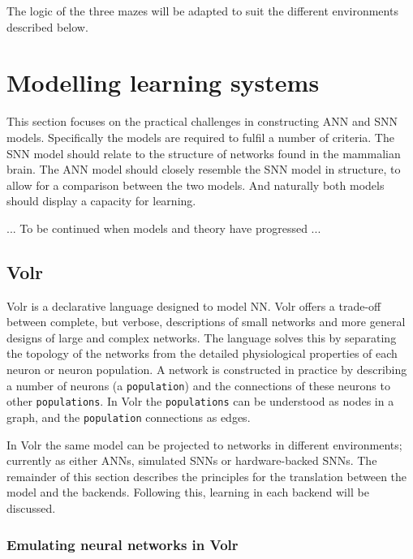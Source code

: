 \documentclass[report.tex]{subfiles}
\begin{document}
The logic of the three mazes will be adapted to suit the different environments described below.

\section{Modelling learning systems} \label{sec:learning}
This section focuses on the practical challenges in constructing ANN and SNN models.
Specifically the models are required to fulfil a number of criteria.
The SNN model should relate to the structure of networks found in the mammalian brain.
The ANN model should closely resemble the SNN model in structure, to allow for a comparison between the two models.
And naturally both models should display a capacity for learning.

... To be continued when models and theory have progressed ...

\subsection{Volr}
Volr is a declarative language designed to model \gls{NN}.
Volr offers a trade-off between complete, but verbose, descriptions of small networks and more general designs of large and complex networks.
The language solves this by separating the topology of the networks from the detailed physiological properties of each neuron or neuron population.
A network is constructed in practice by describing a number of neurons (a \texttt{population}) and the connections of these neurons to other \texttt{populations}.
In Volr the \texttt{populations} can be understood as nodes in a graph, and the \texttt{population} connections as edges.


In Volr the same model can be projected to networks in different environments; currently as either ANNs, simulated SNNs or hardware-backed SNNs.
The remainder of this section describes the principles for the translation between the model and the backends.
Following this, learning in each backend will be discussed.

\subsubsection{Emulating neural networks in Volr}
\end{document}
